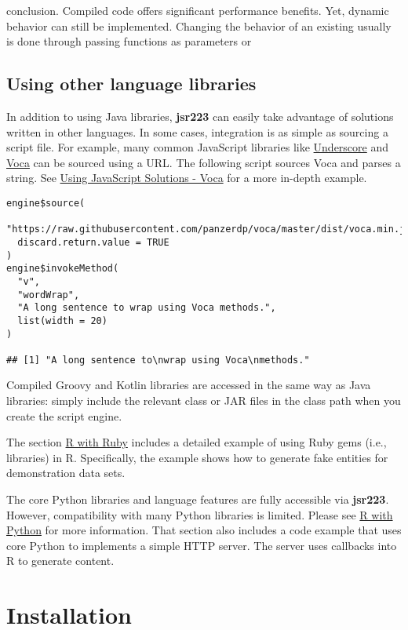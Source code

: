 \documentclass[
article,
11pt, %
a4paper, %
oneside, %
headinclude,footinclude, %
]{scrartcl}
\theoremstyle{definition} %
\theoremstyle{plain} %
\theoremstyle{remark} %
\newcommand{\pkg}[1]{\textbf{#1}}
\begin{document}
conclusion. Compiled code offers significant performance benefits. Yet, dynamic behavior can still be implemented. Changing the behavior of an existing usually is done through passing functions as parameters or 

\subsection{Using other language libraries}

In addition to using Java libraries, \pkg{jsr223} can easily take advantage of solutions written in other languages. In some cases, integration is as simple as sourcing a script file. For example, many common JavaScript libraries like \href{http://underscorejs.org/}{Underscore} and \href{https://vocajs.com/}{Voca} can be sourced using a URL. The following script sources Voca and parses a string. See \hyperlink{using-javascript-solutions-voca}{Using JavaScript Solutions - Voca} for a more in-depth example.

\begin{verbatim}
engine$source(
  "https://raw.githubusercontent.com/panzerdp/voca/master/dist/voca.min.js",
  discard.return.value = TRUE
)
engine$invokeMethod(
  "v", 
  "wordWrap", 
  "A long sentence to wrap using Voca methods.", 
  list(width = 20)
)

## [1] "A long sentence to\nwrap using Voca\nmethods."
\end{verbatim}

Compiled Groovy and Kotlin libraries are accessed in the same way as Java libraries: simply include the relevant class or JAR files in the class path when you create the script engine.

The section \hyperlink{r-with-ruby}{R with Ruby} includes a detailed example of using Ruby gems (i.e., libraries) in R. Specifically, the example shows how to generate fake entities for demonstration data sets.

The core Python libraries and language features are fully accessible via \pkg{jsr223}. However, compatibility with many Python libraries is limited. Please see \hyperlink{r-with-python}{R with Python} for more information. That section also includes a code example that uses core Python to implements a simple HTTP server. The server uses callbacks into R to generate content.

\hypertarget{installation}{}
\section{Installation}
\end{document}
